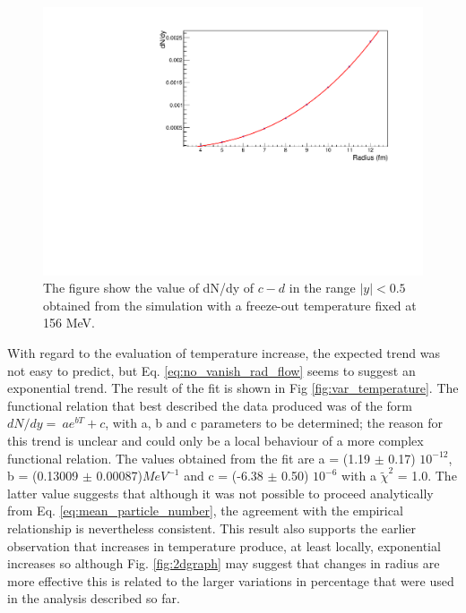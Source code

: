 \documentclass[12pt,a4paper]{book}
\begin{document}
		\begin{figure}
			\centering
		\includegraphics[width=0.7 \linewidth]{pictures/var_radius.pdf}
		\caption{The figure show the value of dN/dy of $c-d$ in the range $|y|<0.5$ obtained from the simulation with a freeze-out temperature fixed at 156 MeV. }
		\label{fig:var_radius}
	\end{figure}
	
		With regard to the evaluation of temperature increase, the expected trend was not easy to predict, but Eq. \ref{eq:no_vanish_rad_flow} seems to suggest an exponential trend. The result of the fit is shown in Fig \ref{fig:var_temperature}. The functional relation that best described the data produced was of the form $dN/dy= \ a e^{bT}+c$, with a, b and c parameters to be determined; the reason for this trend is unclear and could only be a local behaviour of a more complex functional relation. The values obtained from the fit are a = (1.19 $\pm$ 0.17) $10^{-12}$, b = (0.13009 $\pm$ 0.00087)$MeV^{-1}$ and c = (-6.38 $\pm$ 0.50) $10^{-6}$ with a $\tilde{\chi}^2$ = 1.0. The latter value suggests that although it was not possible to proceed analytically from Eq. \ref{eq:mean_particle_number}, the agreement with the empirical relationship is nevertheless consistent. This result also supports the earlier observation that increases in temperature produce, at least locally, exponential increases so although Fig. \ref{fig:2dgraph} may suggest that changes in radius are more  effective this is related to the larger variations in percentage that were used in the analysis described so far.
		  
\end{document}
